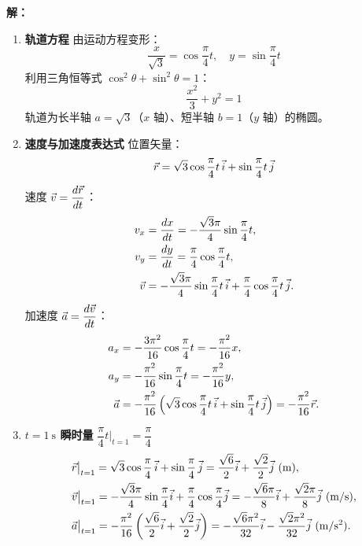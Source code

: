 \noindent\textbf{解：}
\begin{enumerate}
    \item \textbf{轨道方程}
由运动方程变形：
\[
\frac{x}{\sqrt{3}} = \cos\frac{\pi}{4}t,\quad y = \sin\frac{\pi}{4}t
\]
利用三角恒等式 $\cos^2\theta+\sin^2\theta=1$：
\[
\boxed{\frac{x^2}{3} + y^2 = 1}
\]
轨道为长半轴 $a=\sqrt{3}$（$x$ 轴）、短半轴 $b=1$（$y$ 轴）的椭圆。

    \item \textbf{速度与加速度表达式}
位置矢量：
\[
\vec{r} = \sqrt{3}\cos\frac{\pi}{4}t\,\vec{i} + \sin\frac{\pi}{4}t\,\vec{j}
\]
速度 $\vec{v}=\dfrac{d\vec{r}}{dt}$：
\[
\begin{aligned}
v_x &= \frac{dx}{dt} = -\frac{\sqrt{3}\pi}{4}\sin\frac{\pi}{4}t,\\
v_y &= \frac{dy}{dt} = \frac{\pi}{4}\cos\frac{\pi}{4}t,\\
\vec{v} &= -\frac{\sqrt{3}\pi}{4}\sin\frac{\pi}{4}t\,\vec{i} + \frac{\pi}{4}\cos\frac{\pi}{4}t\,\vec{j}.
\end{aligned}
\]
加速度 $\vec{a}=\dfrac{d\vec{v}}{dt}$：
\[
\begin{aligned}
a_x &= -\frac{3\pi^2}{16}\cos\frac{\pi}{4}t = -\frac{\pi^2}{16}x,\\
a_y &= -\frac{\pi^2}{16}\sin\frac{\pi}{4}t = -\frac{\pi^2}{16}y,\\
\vec{a} &= -\frac{\pi^2}{16}\left(\sqrt{3}\cos\frac{\pi}{4}t\,\vec{i}+\sin\frac{\pi}{4}t\,\vec{j}\right)
= -\frac{\pi^2}{16}\vec{r}.
\end{aligned}
\]

    \item \textbf{$t=1\ \mathrm{s}$ 瞬时量}
$\dfrac{\pi}{4}t\big|_{t=1}=\dfrac{\pi}{4}$
\[
\begin{aligned}
&\vect{r}\big|_{t=1} = \sqrt{3}\cos\frac{\pi}{4}\,\vect{i}+\sin\frac{\pi}{4}\,\vect{j}
= \frac{\sqrt{6}}{2}\vect{i} + \frac{\sqrt{2}}{2}\vect{j}\ \mathrm{(m)},\\
&\vect{v}\big|_{t=1} = -\frac{\sqrt{3}\pi}{4}\sin\frac{\pi}{4}\vect{i}
+\frac{\pi}{4}\cos\frac{\pi}{4}\vect{j}
= -\frac{\sqrt{6}\pi}{8}\vect{i}+\frac{\sqrt{2}\pi}{8}\vect{j}\ \mathrm{(m/s)},\\
&\vect{a}\big|_{t=1} = -\frac{\pi^2}{16}\left(\frac{\sqrt{6}}{2}\vect{i}+\frac{\sqrt{2}}{2}\vect{j}\right)
= -\frac{\sqrt{6}\pi^2}{32}\vect{i}-\frac{\sqrt{2}\pi^2}{32}\vect{j}\ \mathrm{(m/s^2)}.
\end{aligned}
\]
\end{enumerate}



